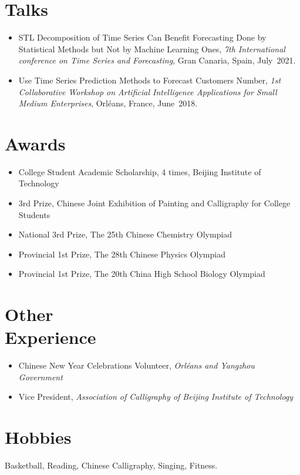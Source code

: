 \documentclass{mycv}
\begin{document}
\section{Talks}

\begin{itemize}
  \item STL Decomposition of Time Series Can Benefit Forecasting Done by Statistical Methods but Not by Machine Learning Ones, \emph{7th International conference on Time Series and Forecasting}, Gran Canaria, Spain, July~2021.
  \item Use Time Series Prediction Methods to Forecast Customers Number, \emph{1st Collaborative Workshop on Artificial Intelligence Applications for Small Medium Enterprises}, Orl\'eans, France, June~2018.
\end{itemize}

\section{Awards}

\begin{itemize}
  \item College Student Academic Scholarship, 4 times, Beijing Institute of Technology 
  \item 3rd Prize, Chinese Joint Exhibition of Painting and Calligraphy for College Students 
  \item National 3rd Prize, The 25th Chinese Chemistry Olympiad 
  \item Provincial 1st Prize, The 28th Chinese Physics Olympiad 
  \item Provincial 1st Prize, The 20th China High School Biology Olympiad 
\end{itemize}

\section{Other \\ Experience}

\begin{itemize}
    \item Chinese New Year Celebrations Volunteer, \emph{Orl\'eans and Yangzhou Government} 
    \item Vice President, \emph{Association of Calligraphy of Beijing Institute of Technology} 
\end{itemize}

\section{Hobbies}

Basketball, Reading, Chinese Calligraphy, Singing, Fitness.
\end{document}
